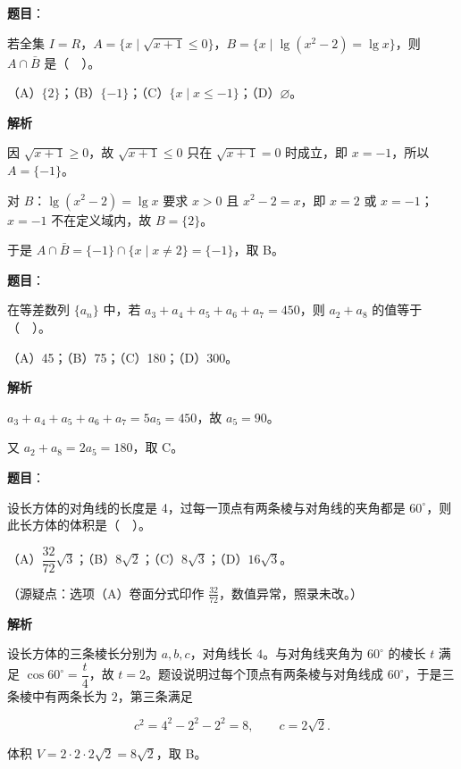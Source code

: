 \begin{answer}

\textbf{题目}：

若全集 $I=R$，$A=\{x\mid\sqrt{x+1}\le 0\}$，$B=\{x\mid\lg(x^{2}-2)=\lg x\}$，则 $A\cap\bar{B}$ 是（　）。

（A）$\{2\}$；（B）$\{-1\}$；（C）$\{x\mid x\le -1\}$；（D）$\varnothing$。

\textbf{解析}

因 $\sqrt{x+1}\ge 0$，故 $\sqrt{x+1}\le 0$ 只在 $\sqrt{x+1}=0$ 时成立，即 $x=-1$，所以 $A=\{-1\}$。

对 $B$：$\lg(x^{2}-2)=\lg x$ 要求 $x>0$ 且 $x^{2}-2=x$，即 $x=2$ 或 $x=-1$；$x=-1$ 不在定义域内，故 $B=\{2\}$。

于是 $A\cap\bar{B}=\{-1\}\cap\{x\mid x\ne 2\}=\{-1\}$，取 B。


\end{answer}
\begin{answer}

\textbf{题目}：

在等差数列 $\{a_{n}\}$ 中，若 $a_{3}+a_{4}+a_{5}+a_{6}+a_{7}=450$，则 $a_{2}+a_{8}$ 的值等于（　）。

（A）45；（B）75；（C）180；（D）300。

\textbf{解析}

$a_{3}+a_{4}+a_{5}+a_{6}+a_{7}=5a_{5}=450$，故 $a_{5}=90$。

又 $a_{2}+a_{8}=2a_{5}=180$，取 C。


\end{answer}
\begin{answer}

\textbf{题目}：

设长方体的对角线的长度是 4，过每一顶点有两条棱与对角线的夹角都是 $60^{\circ}$，则此长方体的体积是（　）。

（A）$\dfrac{32}{72}\sqrt{3}$；（B）$8\sqrt{2}$；（C）$8\sqrt{3}$；（D）$16\sqrt{3}$。

（源疑点：选项（A）卷面分式印作 $\frac{32}{72}$，数值异常，照录未改。）

\textbf{解析}

设长方体的三条棱长分别为 $a,b,c$，对角线长 $4$。与对角线夹角为 $60^{\circ}$ 的棱长 $t$ 满足 $\cos 60^{\circ}=\dfrac{t}{4}$，故 $t=2$。题设说明过每个顶点有两条棱与对角线成 $60^{\circ}$，于是三条棱中有两条长为 $2$，第三条满足

\nopagebreak[4]
\[
c^{2}=4^{2}-2^{2}-2^{2}=8,\qquad c=2\sqrt{2}.
\]

体积 $V=2\cdot 2\cdot 2\sqrt{2}=8\sqrt{2}$，取 B。


\end{answer}
